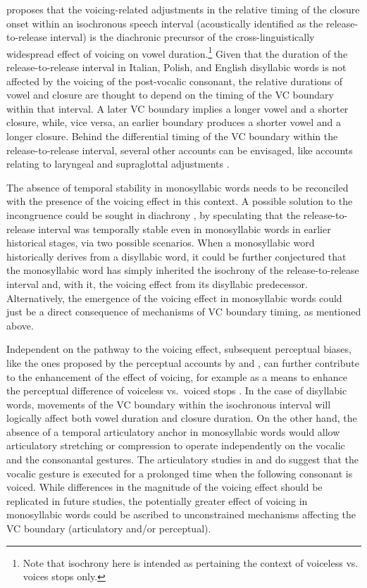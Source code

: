 \documentclass[
  12pt,
  a4paper,
]{article}
\begin{document}
\citet{coretta2018j} proposes that the voicing-related adjustments in
the relative timing of the closure onset within an isochronous speech
interval (acoustically identified as the release-to-release interval) is
the diachronic precursor of the cross-linguistically widespread effect
of voicing on vowel
duration.\footnote{Note that isochrony here is intended as pertaining the context of voiceless vs. voices stops only.}
Given that the duration of the release-to-release interval in Italian,
Polish, and English disyllabic words is not affected by the voicing of
the post-vocalic consonant, the relative durations of vowel and closure
are thought to depend on the timing of the VC boundary within that
interval. A later VC boundary implies a longer vowel and a shorter
closure, while, vice versa, an earlier boundary produces a shorter vowel
and a longer closure. Behind the differential timing of the VC boundary
within the release-to-release interval, several other accounts can be
envisaged, like accounts relating to laryngeal and supraglottal
adjustments \citep{halle1967, begus2017, coretta2019c}.

The absence of temporal stability in monosyllabic words needs to be
reconciled with the presence of the voicing effect in this context. A
possible solution to the incongruence could be sought in diachrony
\citep{blevins2004, blevins2006}, by speculating that the
release-to-release interval was temporally stable even in monosyllabic
words in earlier historical stages, via two possible scenarios. When a
monosyllabic word historically derives from a disyllabic word, it could
be further conjectured that the monosyllabic word has simply inherited
the isochrony of the release-to-release interval and, with it, the
voicing effect from its disyllabic predecessor. Alternatively, the
emergence of the voicing effect in monosyllabic words could just be a
direct consequence of mechanisms of VC boundary timing, as mentioned
above.

Independent on the pathway to the voicing effect, subsequent perceptual
biases, like the ones proposed by the perceptual accounts by
\citet{javkin1976} and \citet{kluender1988}, can further contribute to
the enhancement of the effect of voicing, for example as a means to
enhance the perceptual difference of voiceless vs.~voiced stops
\citep{lisker1974, lisker1986, stevens1989}. In the case of disyllabic
words, movements of the VC boundary within the isochronous interval will
logically affect both vowel duration and closure duration. On the other
hand, the absence of a temporal articulatory anchor in monosyllabic
words would allow articulatory stretching or compression to operate
independently on the vocalic and the consonantal gestures. The
articulatory studies in \citet{raphael1972} and \citet{de-jong1991} do
suggest that the vocalic gesture is executed for a prolonged time when
the following consonant is voiced. While differences in the magnitude of
the voicing effect should be replicated in future studies, the
potentially greater effect of voicing in monosyllabic words could be
ascribed to unconstrained mechanisms affecting the VC boundary
(articulatory and/or perceptual).
\end{document}
